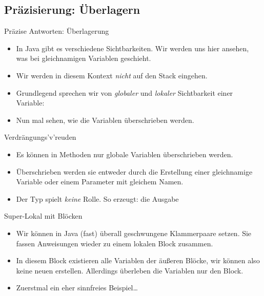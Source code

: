\subsection{Präzisierung: Überlagern}
\begin{frame}[t,fragile]{Präzise Antworten: Überlagerung}
    \begin{itemize}[<+(1)->]
        \item In Java gibt es verschiedene Sichtbarkeiten. \pause{} Wir werden uns hier ansehen, was bei gleichnamigen Variablen geschieht.
        \item Wir werden in diesem Kontext \emph{nicht} auf den Stack eingehen.
        \item Grundlegend sprechen wir von \emph{globaler} und \emph{lokaler} Sichtbarkeit einer Variable:
    \item Nun mal sehen, wie die Variablen überschrieben werden.
    \end{itemize}
\end{frame}

\begin{frame}[t,fragile]{Verdrängungs'v'reuden}
    \begin{itemize}[<+(1)->]
        \item Es können in Methoden nur globale Variablen überschrieben werden.
        \item Überschrieben werden sie entweder durch die Erstellung einer gleichnamige Variable\pause{} oder einem Parameter mit gleichem Namen.
        \item Der Typ spielt \emph{keine} Rolle. So erzeugt:\pause{}
        {%
        }
        \pause{}die Ausgabe 
    \end{itemize}
\end{frame}

\begin{frame}[t,fragile]{Super-Lokal mit Blöcken}
    \begin{itemize}[<+(1)->]
        \item Wir können in Java (fast) überall geschwungene Klammerpaare setzen. \pause{}
              Sie fassen Anweisungen wieder zu einem lokalen Block zusammen.
        \item In diesem Block existieren alle Variablen der äußeren Blöcke,\pause{} wir können also keine neuen erstellen. Allerdings überleben die Variablen nur den Block.
        \item Zuerstmal ein eher sinnfreies Beispiel\ldots{}
    \end{itemize}
\end{frame}

